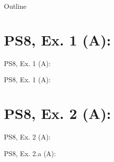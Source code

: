 

\maketitle

  \newcommand{\intuition}[1]{#1} %


\begin{frame}{Outline}
    \tableofcontents
\end{frame}



\section{PS8, Ex. 1 (A): }

\begin{frame}{PS8, Ex. 1 (A): }
  \begin{multicols}{2}
    \vfill\null\columnbreak
    \vfill
  \end{multicols}
\end{frame}

\begin{frame}{PS8, Ex. 1 (A): }
  \begin{multicols}{2}
    \vfill\null\columnbreak
    \vfill
  \end{multicols}
\end{frame}



\section{PS8, Ex. 2 (A): }

\begin{frame}{PS8, Ex. 2 (A): }
  \begin{multicols}{2}
    \vfill\null\columnbreak
    \vfill
  \end{multicols}
\end{frame}

\begin{frame}{PS8, Ex. 2.a (A): }
  \begin{multicols}{2}
    \vfill\null\columnbreak
    \vfill
  \end{multicols}
\end{frame}




